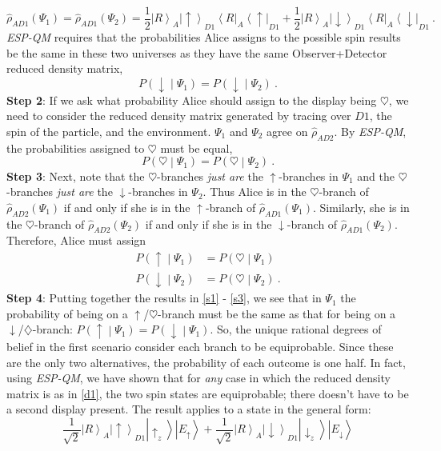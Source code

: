 \documentclass[12pt,onecolumn,secnumarabic,amsmath,amssymb,balancelastpage,nofootinbib]{article}
\newcommand{\bra}[1]{\ensuremath{\left\langle#1\right|}}
\newcommand{\ket}[1]{\ensuremath{\left|#1\right\rangle}}
\begin{document}
\begin{equation}
\widehat{\rho}_{AD1}\left(\Psi_1\right)=\widehat{\rho}_{AD1}\left(\Psi_2\right)=\frac{1}{2}\ket{R}_A\ket{\uparrow}_{D1}\bra{R}_A\bra{\uparrow}_{D1}+\frac{1}{2}\ket{R}_A\ket{\downarrow}_{D1}\bra{R}_A\bra{\downarrow}_{D1}\ .
\label{d1}
\end{equation}
\emph{ESP-QM} requires that the probabilities Alice assigns to the possible spin results be the same in these two universes as they have the same Observer+Detector reduced density matrix,
\begin{equation}
P\left(\downarrow\middle|\Psi_1\right)=P\left(\downarrow\middle|\Psi_2\right)\ .
\label{s1}
\end{equation}
\textbf{Step 2}: If we ask what probability Alice should assign to the display being $\heartsuit$, we need to consider the reduced density matrix generated by tracing over $D1$, the spin of the particle, and the environment.  $\Psi_1$ and $\Psi_2$ agree on $\widehat{\rho}_{AD2}$.  By \emph{ESP-QM}, the probabilities assigned to $\heartsuit$ must be equal,
\begin{equation}
P\left(\heartsuit\middle|\Psi_1\right)=P\left(\heartsuit\middle|\Psi_2\right)\ .
\label{s2}
\end{equation}
\textbf{Step 3}: Next, note that the $\heartsuit$-branches \textit{just are} the $\uparrow$-branches in $\Psi_1$ and the $\heartsuit$-branches \textit{just are} the $\downarrow$-branches in $\Psi_2$.  Thus Alice is in the $\heartsuit$-branch of $\widehat{\rho}_{AD2}(\Psi_1)$ if and only if she is in the $\uparrow$-branch of $\widehat{\rho}_{AD1}(\Psi_1)$.  Similarly, she is in the $\heartsuit$-branch of $\widehat{\rho}_{AD2}(\Psi_2)$ if and only if she is in the $\downarrow$-branch of $\widehat{\rho}_{AD1}(\Psi_2)$.   Therefore, Alice must assign
\begin{align}
P\left(\uparrow\middle|\Psi_1\right)&=P\left(\heartsuit\middle|\Psi_1\right)
\nonumber
\\
P\left(\downarrow\middle|\Psi_2\right)&=P\left(\heartsuit\middle|\Psi_2\right)\ .
\label{s3}
\end{align}
\textbf{Step 4}:  Putting together the results in \eqref{s1} - \eqref{s3}, we see that in $\Psi_1$ the probability of being on a $\uparrow$/$\heartsuit$-branch must be the same as that for being on a $\downarrow$/$\diamondsuit$-branch: $P\left(\uparrow\middle|\Psi_1\right)=P\left(\downarrow\middle|\Psi_1\right)$.  So, the unique rational degrees of belief in the first scenario consider each branch to be equiprobable.  Since these are the only two alternatives, the probability of each outcome is one half.  In fact, using \emph{ESP-QM}, we have shown that for \textit{any} case in which the reduced density matrix is as in \eqref{d1}, the two spin states are equiprobable; there doesn't have to be a second display present.  The result applies to a state in the general form:
\begin{equation}
\frac{1}{\sqrt{2}}\ket{R}_A\ket{\uparrow}_{D1}\ket{\uparrow_z}\ket{E_{\uparrow}}+\frac{1}{\sqrt{2}}\ket{R}_A\ket{\downarrow}_{D1}\ket{\downarrow_z}\ket{E_\downarrow}
\label{general5050}
\end{equation}
\end{document}
